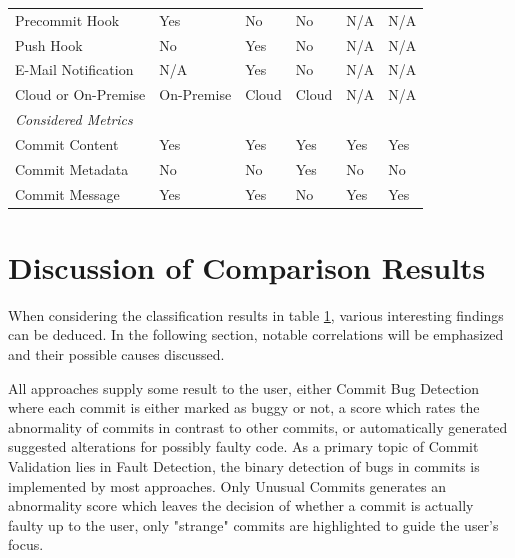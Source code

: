 \begin{table}[t]
\begin{tabular}{@{}llllll@{}}
		Precommit Hook                     & Yes        & No     & No      & N/A    & N/A   \\
		Push Hook                          & No         & Yes    & No      & N/A    & N/A   \\
		E-Mail Notification                & N/A        & Yes    & No      & N/A    & N/A   \\
		Cloud or On-Premise                & On-Premise & Cloud  & Cloud   & N/A    & N/A   \\ \midrule
		\textit{Considered Metrics}        &            &        &         &        &       \\ 
		Commit Content                     & Yes        & Yes    & Yes     & Yes    & Yes   \\
		Commit Metadata                    & No         & No     & Yes     & No     & No    \\
		Commit Message                     & Yes        & Yes    & No      & Yes    & Yes   \\ \bottomrule
	\end{tabular}
	\label{tab:classification}
\end{table}

\section{Discussion of Comparison Results}
\label{sec:discussion}

When considering the classification results in table \ref{tab:classification}, various interesting findings can be deduced. In the following section, notable correlations will be emphasized and their possible causes discussed.

All approaches supply some result to the user, either Commit Bug Detection where each commit is either marked as buggy or not, a score which rates the abnormality of commits in contrast to other commits, or automatically generated suggested alterations for possibly faulty code. As a primary topic of Commit Validation lies in Fault Detection, the binary detection of bugs in commits is implemented by most approaches. Only Unusual Commits \cite{Goyal2017} generates an abnormality score which leaves the decision of whether a commit is actually faulty up to the user, only "strange" commits are highlighted to guide the user's focus.

